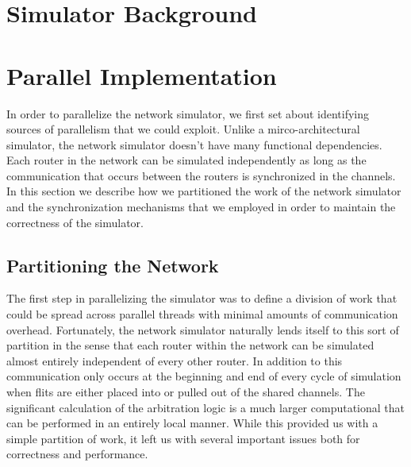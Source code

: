 \documentclass{article}
\begin{document}
\begin{multicols}{2}
\section{Simulator Background \label{background}}


\section{Parallel Implementation \label{para}}
In order to parallelize the network simulator, we first set about
identifying sources of parallelism that we could exploit.  Unlike a
mirco-architectural simulator, the network simulator doesn't have many
functional dependencies.  Each router in the network can be simulated
independently as long as the communication that occurs between the routers
is synchronized in the channels.  In this section we describe how we
partitioned the work of the network simulator and the synchronization
mechanisms that we employed in order to maintain the correctness of the simulator.

\subsection{Partitioning the Network}
The first step in parallelizing the simulator was to define a division of
work that could be spread across parallel threads with minimal amounts of
communication overhead.  Fortunately, the network simulator naturally
lends itself to this sort of partition in the sense that each router
within the network can be simulated almost entirely independent of every
other router.  In addition to this communication only occurs at the
beginning and end of every cycle of simulation when flits are either
placed into or pulled out of the shared channels.  The significant
calculation of the arbitration logic is a much larger computational that
can be performed in an entirely local manner.  While this provided us with
a simple partition of work, it left us with several important issues both
for correctness and performance.


\end{multicols}
\end{document}
